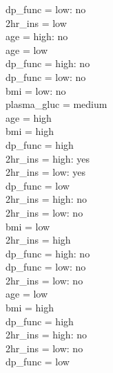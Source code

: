 \documentclass[12pt]{article}
\begin{document}
\textbar\quad \textbar\quad \textbar\quad \textbar\quad dp\_func = low: no\\
\textbar\quad \textbar\quad 2hr\_ins = low\\
\textbar\quad \textbar\quad \textbar\quad age = high: no\\
\textbar\quad \textbar\quad \textbar\quad age = low\\
\textbar\quad \textbar\quad \textbar\quad \textbar\quad dp\_func = high: no\\
\textbar\quad \textbar\quad \textbar\quad \textbar\quad dp\_func = low: no\\
\textbar\quad bmi = low: no\\
plasma\_gluc = medium\\
\textbar\quad age = high\\
\textbar\quad \textbar\quad bmi = high\\
\textbar\quad \textbar\quad \textbar\quad dp\_func = high\\
\textbar\quad \textbar\quad \textbar\quad \textbar\quad 2hr\_ins = high: yes\\
\textbar\quad \textbar\quad \textbar\quad \textbar\quad 2hr\_ins = low: yes\\
\textbar\quad \textbar\quad \textbar\quad dp\_func = low\\
\textbar\quad \textbar\quad \textbar\quad \textbar\quad 2hr\_ins = high: no\\
\textbar\quad \textbar\quad \textbar\quad \textbar\quad 2hr\_ins = low: no\\
\textbar\quad \textbar\quad bmi = low\\
\textbar\quad \textbar\quad \textbar\quad 2hr\_ins = high\\
\textbar\quad \textbar\quad \textbar\quad \textbar\quad dp\_func = high: no\\
\textbar\quad \textbar\quad \textbar\quad \textbar\quad dp\_func = low: no\\
\textbar\quad \textbar\quad \textbar\quad 2hr\_ins = low: no\\
\textbar\quad age = low\\
\textbar\quad \textbar\quad bmi = high\\
\textbar\quad \textbar\quad \textbar\quad dp\_func = high\\
\textbar\quad \textbar\quad \textbar\quad \textbar\quad 2hr\_ins = high: no\\
\textbar\quad \textbar\quad \textbar\quad \textbar\quad 2hr\_ins = low: no\\
\textbar\quad \textbar\quad \textbar\quad dp\_func = low\\
\end{document}
